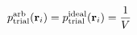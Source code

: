 \documentclass[12pt]{article}
\begin{document}
\begin{displaymath}
p_{\rm trial}^{\rm arb}({\bf r}_i) = p_{\rm trial}^{\rm ideal}({\bf r}_i) = {{1}\over{V}}
\end{displaymath}
\end{document}
